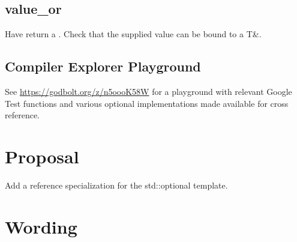 \documentclass[a4paper,10pt,oneside,openany,final,article]{memoir}
\begin{document}
\section{value_or}
Have  return a . Check that the supplied value can be bound to a T\&.

\section{Compiler Explorer Playground}

See \url{https://godbolt.org/z/n5oooK58W} for a playground with relevant Google Test functions and various optional implementations made available for cross reference.

\chapter{Proposal}

Add a reference specialization for the std::optional template.

\chapter{Wording}
\end{document}
